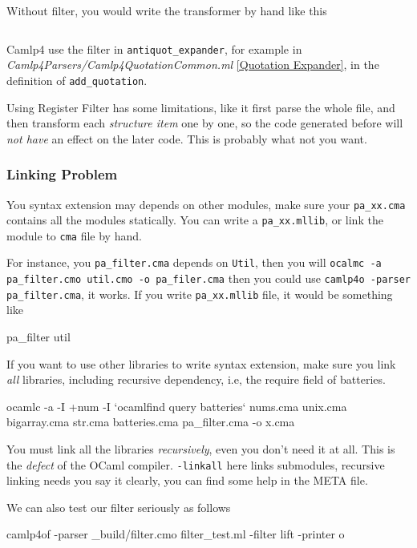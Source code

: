 Without filter, you would write the transformer by hand like this
\inputminted[fontsize=\scriptsize, fontsize=\scriptsize,
]{ocaml}{code/camlp4/filters/ast_map/ast_map_o.ml}

Camlp4 use the filter in \verb|antiquot_expander|, for example in
\textit{Camlp4Parsers/Camlp4QuotationCommon.ml} \ref{Quotation
  Expander}, in the definition of \verb|add_quotation|.

Using Register Filter has some limitations, like it first parse the
whole file, and then transform each \textit{structure item} one by one,
so the code generated before will \textit{not have} an effect on the
later code. This is probably what not you want.

\subsubsection{Linking Problem}
You syntax extension may depends on other modules, make sure your
\verb|pa_xx.cma| contains all the modules statically. You can write a
\verb|pa_xx.mllib|, or link the module to \verb|cma| file by hand.

For instance, you \verb|pa_filter.cma| depends on \verb|Util|, then
you will 
\verb|ocalmc -a pa_filter.cmo util.cmo -o pa_filer.cma|
then you could use \verb|camlp4o -parser pa_filter.cma|, it works.
If you write \verb|pa_xx.mllib| file, it would be something like

\begin{bashcode}
pa_filter
util
\end{bashcode}
If you want to use other libraries to write syntax extension, make
sure you link \textit{all} libraries, including recursive dependency,
i.e, the require field of batteries.

\begin{bashcode}
ocamlc -a  -I +num -I `ocamlfind query batteries` nums.cma unix.cma
bigarray.cma str.cma batteries.cma pa_filter.cma -o x.cma
\end{bashcode}

You must link all the libraries \textit{recursively}, even you don't
need it at all. This is the \textit{defect} of the OCaml compiler.
\verb|-linkall| here links submodules, recursive linking needs you say
it clearly, you can find some help in the META file.

We can also test our filter seriously as follows

\begin{bashcode}
camlp4of -parser _build/filter.cmo filter_test.ml -filter lift -printer o   
\end{bashcode}



